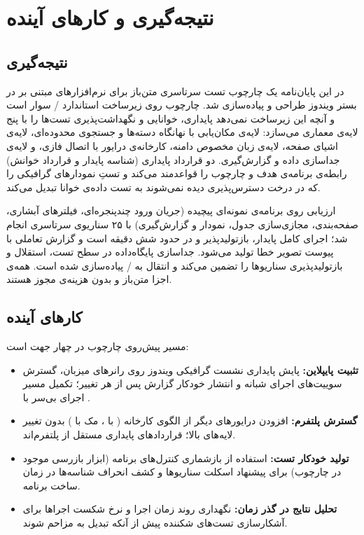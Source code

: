 \chapter{نتیجه‌گیری و کارهای آینده}
\label{chap:conclusion}

\section{نتیجه‌گیری}
در این پایان‌نامه یک چارچوب تست سرتاسری متن‌باز برای نرم‌افزارهای مبتنی بر
در بستر ویندوز طراحی و پیاده‌سازی شد. چارچوب روی زیرساخت استاندارد
/
سوار است و آنچه این زیرساخت نمی‌دهد \pdash{} پایداری، خوانایی و نگهداشت‌پذیری تست‌ها \pdash{} را با پنج لایه‌ی معماری می‌سازد: لایه‌ی مکان‌یابی با نهانگاه دسته‌ها و جستجوی محدوده‌ای، لایه‌ی اشیای صفحه، لایه‌ی زبان مخصوص دامنه، کارخانه‌ی درایور با اتصال فازی، و لایه‌ی جداسازی داده و گزارش‌گیری. دو قرارداد پایداری (شناسه پایدار و قرارداد خوانش) رابطه‌ی برنامه‌ی هدف و چارچوب را قواعد‌مند می‌کند و تستِ نمودارهای گرافیکی را \pdash{} که در درخت دسترس‌پذیری دیده نمی‌شوند \pdash{} به تست داده‌ی خوانا تبدیل می‌کند.

ارزیابی روی برنامه‌ی نمونه‌ای پیچیده (جریان ورود چندپنجره‌ای، فیلترهای آبشاری، صفحه‌بندی، مجازی‌سازی جدول، نمودار و گزارش‌گیری) با ۲۵ سناریوی سرتاسری انجام شد؛ اجرای کامل پایدار، بازتولیدپذیر و در حدود شش دقیقه است و گزارش تعاملی
با پیوست تصویر خطا تولید می‌شود. جداسازی پایگاه‌داده در سطح تست، استقلال و بازتولیدپذیری سناریوها را تضمین می‌کند و انتقال به
/
پیاده‌سازی شده است. همه‌ی اجزا متن‌باز و بدون هزینه‌ی مجوز هستند.

\section{کارهای آینده}
مسیر پیش‌روی چارچوب در چهار جهت است:
\begin{itemize}
	\item \textbf{تثبیت پایپلاین:} پایش پایداری نشست گرافیکی ویندوز روی رانرهای میزبان، گسترش سوییت‌های اجرای شبانه و انتشار خودکار گزارش پس از هر تغییر؛ تکمیل مسیر اجرای بی‌سر با
	.
	\item \textbf{گسترش پلتفرم:} افزودن درایورهای دیگر از الگوی کارخانه (
	با
	،
	مک با
	)
	بدون تغییر لایه‌های بالا؛ قراردادهای پایداری مستقل از پلتفرم‌اند.
	\item \textbf{تولید خودکار تست:} استفاده از بازشماری کنترل‌های برنامه (ابزار بازرسی موجود در چارچوب) برای پیشنهاد اسکلت سناریوها و کشف انحراف شناسه‌ها در زمان ساخت برنامه.
	\item \textbf{تحلیل نتایج در گذر زمان:} نگهداری روند زمان اجرا و نرخ شکست اجراها برای آشکارسازی تست‌های شکننده پیش از آنکه تبدیل به مزاحم شوند.
\end{itemize}
